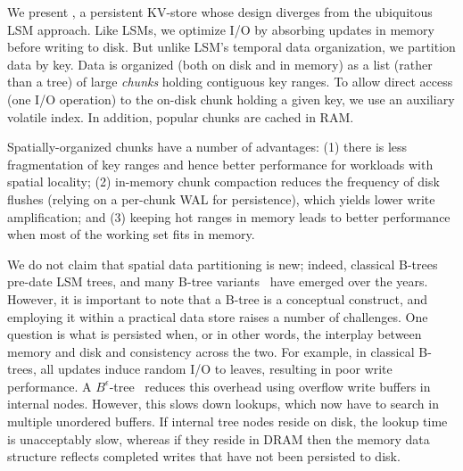 We present \sys, a persistent KV-store whose design diverges from the ubiquitous LSM approach.  
Like  LSMs,  we optimize I/O by absorbing updates in memory before writing to disk. 
But unlike LSM's temporal data organization, we partition data by key. %
Data is  organized (both on disk and in memory) as a list (rather than a tree) 
of large \emph{chunks} holding contiguous key ranges.
To allow direct access (one I/O operation) to the on-disk chunk holding a given key, we use an auxiliary volatile index.  
In addition, popular chunks are cached in RAM.

Spatially-organized chunks have a number of advantages:
(1) there is less fragmentation of key ranges and hence better  performance for workloads with spatial locality; 
(2) in-memory chunk compaction reduces the frequency of  disk flushes  (relying on a per-chunk WAL for persistence), which 
yields lower write amplification; and 
(3) keeping hot ranges in memory leads to better performance when most of the working set fits in memory.

We do not claim that spatial data partitioning is  new; indeed, classical B-trees~\cite{DBLP:conf/sigmod/BayerM70} 
 pre-date  LSM trees, and many B-tree variants~\cite{Brodal:2003:LBE:644108.644201}  have  emerged over the years. 
 However, it is important to note that a B-tree is a conceptual construct, and employing it within a practical data store  raises a number of challenges. 
One question is what is persisted when, or in other words, the interplay between memory and disk  and 
consistency across the two. For example, in classical B-trees, 
all updates induce random I/O to leaves, resulting in poor write performance. 
A $B^{\epsilon}$-tree~\cite{Brodal:2003:LBE:644108.644201}  reduces this overhead using overflow write buffers in internal nodes. 
However, this slows down lookups, which now have to search in multiple unordered buffers. 
If internal tree nodes reside on disk, the lookup time is unacceptably slow, whereas
if they reside in DRAM then the memory data structure reflects 
completed writes that have not been persisted to disk. 

